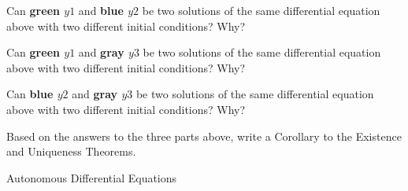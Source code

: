 \begin{parts}
	\item Can \textbf{\color{green} green $y1$} and \textbf{\color{blue} blue $y2$} be two solutions of the same differential equation above with two different initial conditions? Why?
	\item Can \textbf{\color{green} green $y1$} and \textbf{\color{gray} gray $y3$} be two solutions of the same differential equation above with two different initial conditions? Why?
	\item Can \textbf{\color{blue} blue $y2$} and \textbf{\color{gray} gray $y3$} be two solutions of the same differential equation above with two different initial conditions? Why?

	\item Based on the answers to the three parts above, write a Corollary to the Existence and Uniqueness Theorems.
\end{parts}









%	
%	












\begin{module}{Autonomous Differential Equations}

	\label{model-odes}

	
	






\end{module}



